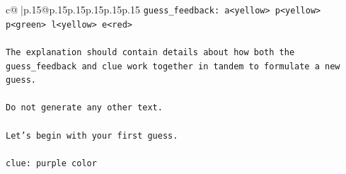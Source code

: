 \documentclass{article}
\begin{document}
{\begin{supertabular}{c@{$\;$}|p{.15\linewidth}@{}p{.15\linewidth}p{.15\linewidth}p{.15\linewidth}p{.15\linewidth}p{.15\linewidth}}
{{{\texttt{guess\_feedback: a<yellow> p<yellow> p<green> l<yellow> e<red>} \\
\\ 
\texttt{The explanation should contain details about how both the guess\_feedback and clue work together in tandem to formulate a new guess.} \\
\\ 
\texttt{Do not generate any other text.} \\
\\ 
\texttt{Let's begin with your first guess.} \\
\\ 
\texttt{clue: purple color} \\
            }
        }
    }
     \\ \\


\end{supertabular}}
\end{document}
